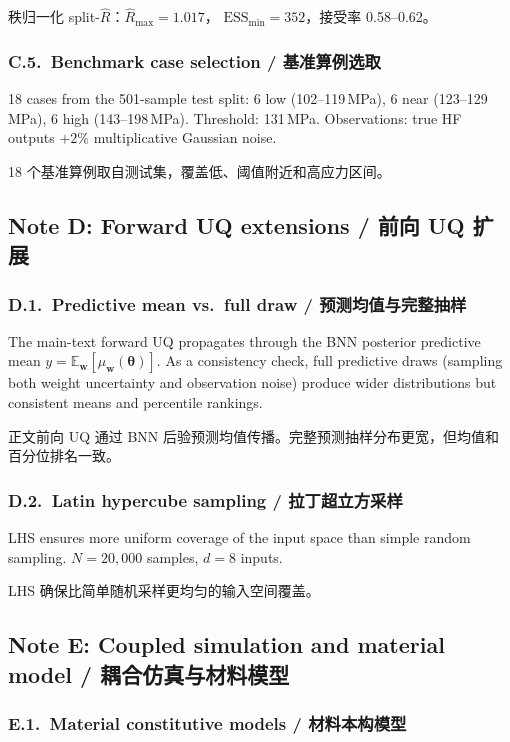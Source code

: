\documentclass[11pt,a4paper]{article}
\begin{document}
秩归一化 split-$\hat{R}$：$\hat{R}_\mathrm{max} = 1.017$，
$\mathrm{ESS}_\mathrm{min} = 352$，接受率 0.58--0.62。

\subsubsection*{C.5.~Benchmark case selection / 基准算例选取}

18 cases from the 501-sample test split: 6 low (102--119\,MPa), 6 near
(123--129\,MPa), 6 high (143--198\,MPa). Threshold: 131\,MPa.
Observations: true HF outputs $+ 2\%$ multiplicative Gaussian noise.

18 个基准算例取自测试集，覆盖低、阈值附近和高应力区间。


\subsection{Note D: Forward UQ extensions / 前向 UQ 扩展}

\subsubsection*{D.1.~Predictive mean vs.\ full draw / 预测均值与完整抽样}

The main-text forward UQ propagates through the BNN posterior predictive
mean $y = \mathbb{E}_{\mathbf{w}}[\mu_{\mathbf{w}}(\boldsymbol{\theta})]$.
As a consistency check, full predictive draws (sampling both weight
uncertainty and observation noise) produce wider distributions but
consistent means and percentile rankings.

正文前向 UQ 通过 BNN 后验预测均值传播。完整预测抽样分布更宽，但均值和
百分位排名一致。

\subsubsection*{D.2.~Latin hypercube sampling / 拉丁超立方采样}

LHS ensures more uniform coverage of the input space than simple random
sampling. $N = 20{,}000$ samples, $d = 8$ inputs.

LHS 确保比简单随机采样更均匀的输入空间覆盖。


\subsection{Note E: Coupled simulation and material model /
耦合仿真与材料模型}

\subsubsection*{E.1.~Material constitutive models / 材料本构模型}
\end{document}
